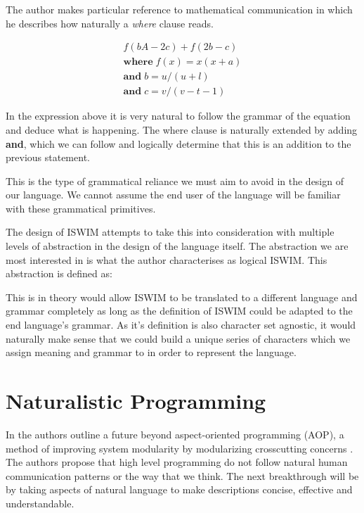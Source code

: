\documentclass[12pt]{article}
\begin{document}
The author makes particular reference to mathematical communication in which he describes how
naturally a \emph{where} clause reads.


\begin{gather*}
f(bA - 2c) + f(2b - c)\\
\textbf{where}\; f(x) = x(x+a)\\
\textbf{and}\; b = u/(u+l)\\
\textbf{and}\; c = v/(v-t-1)
\end{gather*}

In the expression above it is very natural to follow the grammar of the equation and deduce what is
happening. The where clause is naturally extended by adding \textbf{and}, which we can follow and logically
determine that this is an addition to the previous statement.

This is the type of grammatical reliance we must aim to avoid in the design of our language. We cannot
assume the end user of the language will be familiar with these grammatical primitives.

The design of ISWIM attempts to take this into consideration with multiple levels of abstraction in the
design of the language itself. The abstraction we are most interested in is what the author characterises as
logical ISWIM. This abstraction is defined as:


This is in theory would allow ISWIM to be translated to a different language and grammar completely
as long as the definition of ISWIM could be adapted to the end language's grammar. As it's definition is also
character set agnostic, it would naturally make sense that we could build a unique series of characters
which we assign meaning and grammar to in order to represent the language.

\section{Naturalistic Programming}

In \parencite{Lopes:2003:BAT:949344.949400} the authors outline a future beyond aspect-oriented
programming (AOP), a method of improving system modularity by modularizing crosscutting concerns \parencite{murphy}.
The authors propose that high level programming do not follow natural human communication patterns
or the way that we think. The next breakthrough will be by taking aspects of natural language
to make descriptions concise, effective and understandable.
\end{document}

